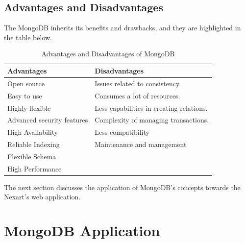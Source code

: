 \documentclass[a4Paper,12pt]{report}
\begin{document}
\section{Advantages and Disadvantages}
The MongoDB inherits its benefits and drawbacks, and they are highlighted in the table below. 
\begin{table}[H]
\centering
\begin{tabularx}{\textwidth}{XX}\hline
Advantages & Disadvantages\\\hline
Open source & Issues related to consistency.\\
Easy to use & Consumes a lot of resources.\\
Highly flexible & Less capabilities in creating relations.\\
Advanced security features & Complexity of managing transactions.\\
High Availability & Less compatibility\\
Reliable Indexing & Maintenance and management\\
Flexible Schema &\\
High Performance &\\\hline
\end{tabularx}
\caption{Advantages and Disadvantages of MongoDB}
\end{table}
The next section discusses the application of MongoDB’s concepts towards the Nexart’s web application.
\chapter{MongoDB Application}
\end{document}
